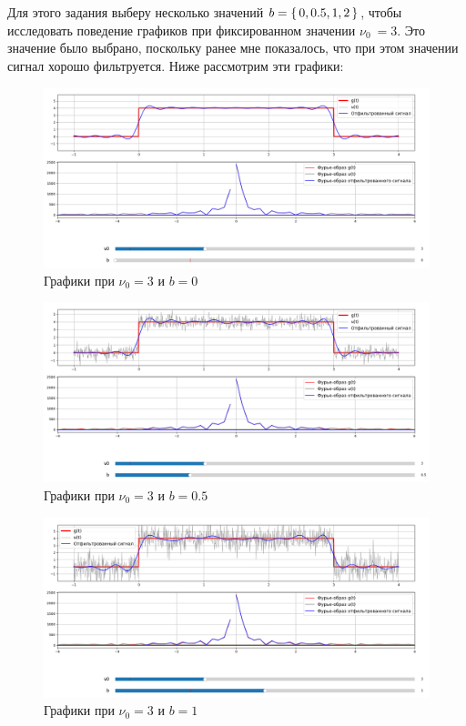 \documentclass[a4paper,12pt]{article}
\begin{document}
Для этого задания выберу несколько значений \(b = \set{0, 0.5, 1, 2}\),
чтобы исследовать поведение графиков при фиксированном значении \(\nu_0\ = 3\).
Это значение было выбрано, поскольку ранее мне показалось, что при этом значении
сигнал хорошо фильтруется.
Ниже рассмотрим эти графики:

\begin{figure}[H]  
    \centering
    \includegraphics[width=1\textwidth]{../images/1.1_0_3.png}
    \caption{Графики при \(\nu_0 = 3\) и \(b = 0\)}  
    \label{fig:my_image}  
\end{figure}

\begin{figure}[H]  
    \centering
    \includegraphics[width=1\textwidth]{../images/1.1_0.5_3.png}
    \caption{Графики при \(\nu_0 = 3\) и \(b = 0.5\)}  
    \label{fig:my_image}  
\end{figure}

\begin{figure}[H]  
    \centering
    \includegraphics[width=1\textwidth]{../images/1.1_1_3.png}
    \caption{Графики при \(\nu_0 = 3\) и \(b = 1\)}  
    \label{fig:my_image}  
\end{figure}
\end{document}

